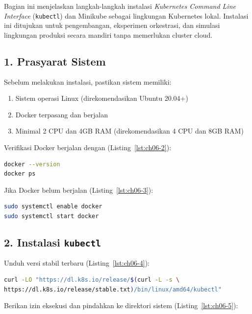 Bagian ini menjelaskan langkah-langkah instalasi \textit{Kubernetes Command Line Interface} (\texttt{kubectl}) dan Minikube sebagai lingkungan Kubernetes lokal. Instalasi ini ditujukan untuk pengembangan, eksperimen orkestrasi, dan simulasi lingkungan produksi secara mandiri tanpa memerlukan cluster cloud.

\subsection*{1. Prasyarat Sistem}

Sebelum melakukan instalasi, pastikan sistem memiliki:

\begin{enumerate}
    \item Sistem operasi Linux (direkomendasikan Ubuntu 20.04+)
    \item Docker terpasang dan berjalan
    \item Minimal 2 CPU dan 4GB RAM (direkomendasikan 4 CPU dan 8GB RAM)
\end{enumerate}

Verifikasi Docker berjalan dengan (Listing~\ref{lst:ch06-2}):

\begin{lstlisting}[language=bash, caption={Memeriksa versi Docker}, label={lst:ch06-2}]
docker --version
docker ps
\end{lstlisting}

Jika Docker belum berjalan (Listing~\ref{lst:ch06-3}):

\begin{lstlisting}[language=bash, caption={Perintah sudo systemctl enable docker}, label={lst:ch06-3}]
sudo systemctl enable docker
sudo systemctl start docker
\end{lstlisting}

\subsection*{2. Instalasi \texttt{kubectl}}

Unduh versi stabil terbaru (Listing~\ref{lst:ch06-4}):

\begin{lstlisting}[language=bash, caption={Menguji layanan dengan curl}, label={lst:ch06-4}]
curl -LO "https://dl.k8s.io/release/$(curl -L -s \
https://dl.k8s.io/release/stable.txt)/bin/linux/amd64/kubectl"
\end{lstlisting}

Berikan izin eksekusi dan pindahkan ke direktori sistem (Listing~\ref{lst:ch06-5}):


